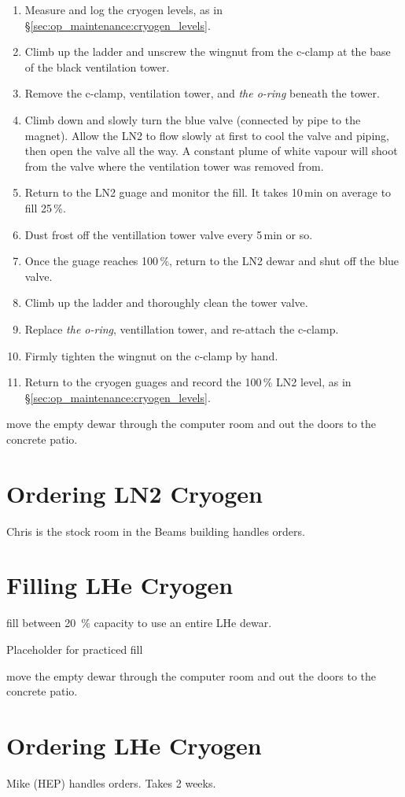 \begin{enumerate}
\item Measure and log the cryogen levels, as in \S\ref{sec:op_maintenance:cryogen_levels}.
\item Climb up the ladder and unscrew the wingnut from the c-clamp at the base of the black ventilation tower.
\item Remove the c-clamp, ventilation tower, and \textit{the o-ring} beneath the tower.
\item Climb down and slowly turn the blue valve (connected by pipe to the magnet).  Allow the LN2 to flow slowly at first to cool the valve and piping, then open the valve all the way.  A constant plume of white vapour will shoot from the valve where the ventilation tower was removed from.
\item Return to the LN2 guage and monitor the fill. It takes 10\,min on average to fill 25\,\%.
\item Dust frost off the ventillation tower valve every 5\,min or so.
\item Once the guage reaches 100\,\%, return to the LN2 dewar and shut off the blue valve.
\item Climb up the ladder and thoroughly clean the tower valve.
\item Replace \textit{the o-ring}, ventillation tower, and re-attach the c-clamp.
\item Firmly tighten the wingnut on the c-clamp by hand.
\item Return to the cryogen guages and record the 100\,\% LN2 level, as in \S\ref{sec:op_maintenance:cryogen_levels}.
\end{enumerate}

\begin{pleasedo} move the empty dewar through the computer room and out the doors to the concrete patio. \end{pleasedo}

\section{Ordering LN2 Cryogen}
\label{sec:op_maintenance:ordering_ln2}

Chris is the stock room in the Beams building handles orders.

\section{Filling LHe Cryogen}
\label{sec:op_maintenance:filling_lhe}
\begin{pleasedo} fill between 20~\% capacity to use an entire LHe dewar. \end{pleasedo}
\FIXME Placeholder for practiced fill
\begin{pleasedo} move the empty dewar through the computer room and out the doors to the concrete patio. \end{pleasedo}

\section{Ordering LHe Cryogen}
\label{sec:op_maintenance:ordering_lhe}

Mike (HEP) handles orders.  Takes 2 weeks.

